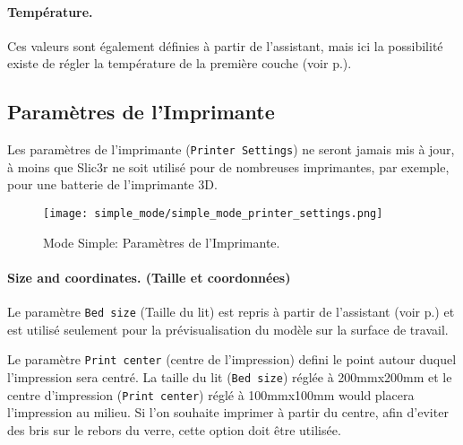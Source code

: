 \paragraph{Température.} %
\label{par:temperature}
Ces valeurs sont également définies à partir de l'assistant, mais ici la possibilité existe de régler la température de la première couche (voir p.\pageref{sec:the_important_first_layer}).


\subsection{Paramètres de l'Imprimante}

Les paramètres de l'imprimante (\texttt{Printer Settings}) ne seront jamais mis à jour, à moins que Slic3r ne soit utilisé pour de nombreuses imprimantes, par exemple, pour une batterie de l'imprimante 3D.

\begin{figure}[H]
\centering
\texttt{[image: simple\_mode/simple\_mode\_printer\_settings.png]}
\caption{Mode Simple: Paramètres de l'Imprimante.}
\label{fig:simple_mode_printer_settings}
\end{figure}

\paragraph{Size and coordinates. (Taille et coordonnées)} %
\label{par:size_and_coordinates}
Le paramètre \texttt{Bed size} (Taille du lit) est repris à partir de l'assistant (voir p.\pageref{sub:2_bed_size}) et est utilisé seulement pour la prévisualisation du modèle sur la surface de travail.

Le paramètre \texttt{Print center} (centre de l'impression) defini le point autour duquel l'impression sera centré.  La taille du lit (\texttt{Bed size}) réglée à 200mmx200mm et le centre d'impression (\texttt{Print center}) réglé à 100mmx100mm would placera l'impression au milieu.  Si l'on souhaite imprimer à partir du centre, afin d'eviter des bris sur le rebors du verre, cette option doit être utilisée.

